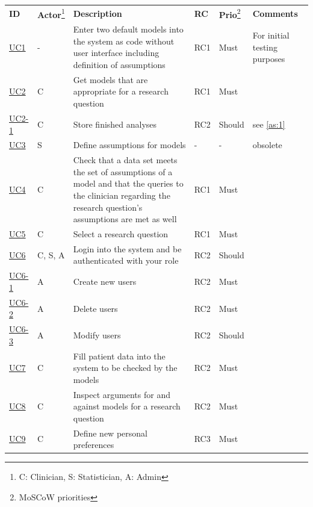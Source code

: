 \begin{landscape}
	\begin{longtable}{ l l p{11cm} l l p{3cm} }
		\textbf{ID}                         & \textbf{\Gls{Actor}}\footnote{C: Clinician, S: Statistician, A: Admin} &\textbf{Description} &  \textbf{RC} & \textbf{Prio}\footnote{MoSCoW priorities} &  \textbf{Comments}\\
		\href{https://trello.com/c/KEOokZp9}{UC1}   & 	- & 	Enter two default models into the system as code without user interface including definition of assumptions & RC1 & Must &  For initial testing purposes  \\
		\href{https://trello.com/c/ebVrFdA5}{UC2}   & 	C & 	Get models that are appropriate for a research question & RC1	& Must &	   \\
		\href{https://trello.com/c/ORRBjISQ}{UC2-1} & 	C & 	Store finished analyses & RC2 & Should &  see \autoref{as:1} \\
		\href{https://trello.com/c/qKLAoWRj}{UC3} 	&  	S & 	Define assumptions for models & - & - & obsolete \\
		\href{https://trello.com/c/7NINsfz8}{UC4}   & 	C & 	Check that a data set meets the set of assumptions of a model and that the queries to the clinician regarding the research question's  assumptions are met as well & RC1 & Must   &   \\
		\href{https://trello.com/c/22JGne3r}{UC5}   & 	C & 	Select a research question & RC1 & Must &   \\
		\href{https://trello.com/c/CVGBVWID}{UC6}   &   C, S, A & 	Login into the system and be authenticated with your role & RC2 & Should &	 \\
		\href{https://trello.com/c/pId27kJM}{UC6-1} &   A & 	Create new users & RC2 & Must &	 \\
		\href{https://trello.com/c/pQ98qgSL}{UC6-2} &  	A & 	Delete users & RC2 & Must	 &   \\
		\href{https://trello.com/c/mvxBeNSR}{UC6-3} &  	A & 	Modify users & RC2 & Should &   \\
		\href{https://trello.com/c/DidVQKAS}{UC7}   &   C & 	Fill patient data into the system to be checked by the models & RC2 & Must &  \\
		\href{https://trello.com/c/be2088JH}{UC8}	& 	C & 	Inspect arguments for and against models for a research question & RC2 & Must &   \\
		\href{https://trello.com/c/Ca9mA3uA}{UC9}   &   C & 	Define new personal preferences & RC3 & Must &   \\

\end{longtable}
\end{landscape}
